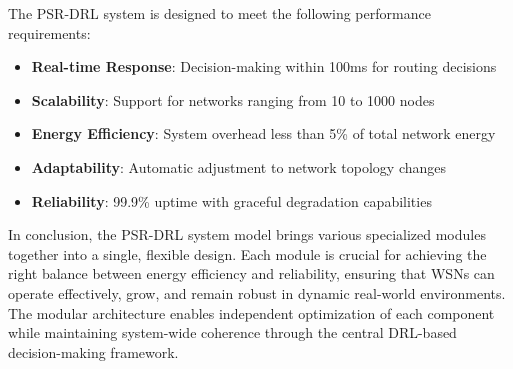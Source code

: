 The PSR-DRL system is designed to meet the following performance requirements:

\begin{itemize}
    \item \textbf{Real-time Response}: Decision-making within 100ms for routing decisions
    \item \textbf{Scalability}: Support for networks ranging from 10 to 1000 nodes
    \item \textbf{Energy Efficiency}: System overhead less than 5\% of total network energy
    \item \textbf{Adaptability}: Automatic adjustment to network topology changes
    \item \textbf{Reliability}: 99.9\% uptime with graceful degradation capabilities
\end{itemize}

\vspace{0.5em}
In conclusion, the PSR-DRL system model brings various specialized modules together into a single, flexible design. Each module is crucial for achieving the right balance between energy efficiency and reliability, ensuring that WSNs can operate effectively, grow, and remain robust in dynamic real-world environments. The modular architecture enables independent optimization of each component while maintaining system-wide coherence through the central DRL-based decision-making framework.
